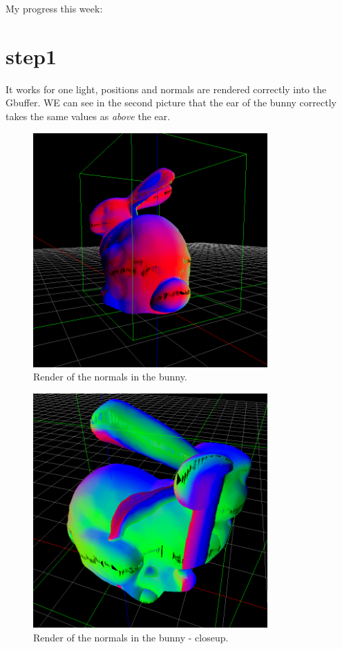 \documentclass[12pt, twoside,a4paper]{article}
\begin{document}
My progress this week:

\section{step1}
It works for one light, positions and normals are rendered correctly into the Gbuffer. WE can see in the second picture that the ear of the bunny correctly takes the same values as \emph{above} the ear.

\vspace{1cm}
\begin{figure}[here]
\centering
\includegraphics[width=0.8\textwidth]{rendernormals}
\caption{Render of the normals in the bunny.}
\end{figure}

\clearpage
\begin{figure}[here]
\centering
\includegraphics[width=0.8\textwidth]{normals_detail}
\caption{Render of the normals in the bunny - closeup.}
\end{figure}
\clearpage
\end{document}
